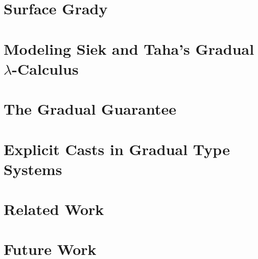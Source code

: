 \documentclass[sigplan]{acmart}\settopmatter{printfolios=true}
\begin{document}
\section{Surface Grady}
\label{sec:surface_grady}


\section{Modeling Siek and Taha's Gradual $\lambda$-Calculus}
\label{sec:modeling_siek_and_taha's_gradual_lambda-calculus}


\section{The Gradual Guarantee}
\label{sec:the_gradual_guarantee}


\section{Explicit Casts in Gradual Type Systems}
\label{sec:explicit_casts_in_gradual_type_systems}


\section{Related Work}
\label{sec:related_work}



\section{Future Work}
\label{sec:conclusion}




\appendix





\end{document}
